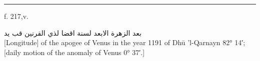 \documentclass[11pt]{article}
\begin{document}
\clearpage
\noindent{}
\par\vspace{-1mm}\noindent\rule{\textwidth}{.4pt}\par\vspace{1mm}
\begin{center}{\small f. 217,v.}\end{center}\vspace{-3mm}
\begin{center}\textarabic{بعد الزهرة الابعد لسنة اقضا لذي القرنين قب يد}\\[1mm]{\small [Longitude] of the apogee of Venus in the year 1191 of Dhū ’l-Qarnayn 82° 14′; [daily motion of the anomaly of Venus 0° 37′.]}\end{center}\vspace{-2mm}
\end{document}
